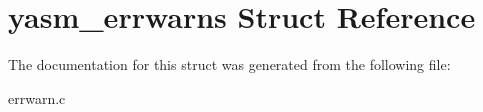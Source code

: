 \hypertarget{structyasm__errwarns}{\section{yasm\-\_\-errwarns Struct Reference}
\label{structyasm__errwarns}
}


The documentation for this struct was generated from the following file\-:\begin{DoxyCompactItemize}
\item 
errwarn.\-c\end{DoxyCompactItemize}
